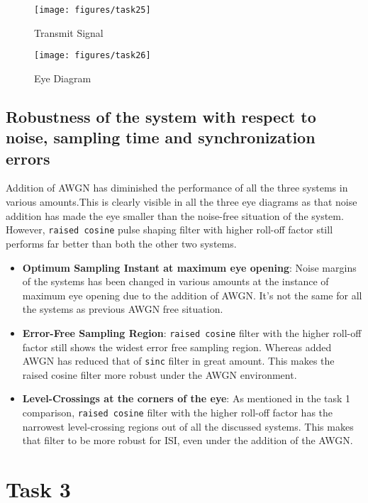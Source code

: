 \documentclass[a4paper,11pt]{article}%
\begin{document}
\begin{figure}[H]
	\centering
	\texttt{[image: figures/task25]}
	\caption{Transmit Signal}
\end{figure}

\begin{figure}[H]
	\centering
	\texttt{[image: figures/task26]}
	\caption{Eye Diagram}
\end{figure}

\subsection{Robustness of the system with respect to noise, sampling time and synchronization errors}

Addition of AWGN has diminished the performance of all the three systems in various amounts.This is clearly visible in all the three eye diagrams as that noise addition has made the eye smaller than the noise-free situation of the system. However, {\tt raised cosine} pulse shaping filter with higher roll-off factor still performs far better than both the other two systems. 

\begin{itemize}
	\item \textbf{Optimum Sampling Instant at maximum eye opening}: Noise margins of the systems has been changed in various amounts at the instance of maximum eye opening due to the addition of AWGN. It's not the same for all the systems as previous AWGN free situation.
	
	\item \textbf{Error-Free Sampling Region}: {\tt raised cosine} filter with  the higher roll-off factor still shows the widest error free sampling region. Whereas added AWGN has reduced that of {\tt sinc} filter in great amount. This makes the raised cosine filter more robust under the AWGN environment.
	
	\item \textbf{Level-Crossings at the corners of the eye}: As mentioned in the task 1 comparison, {\tt raised cosine} filter with  the higher roll-off factor has the narrowest level-crossing regions out of all the discussed systems. This makes that filter to be more robust for ISI, even under the addition of the AWGN.	
\end{itemize}

\section{Task 3}
\end{document}

